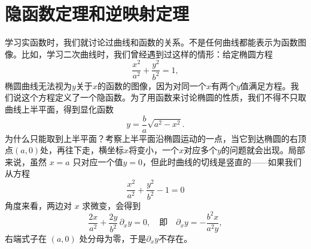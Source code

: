 \documentclass[12pt,UTF8,fontset=none]{ctexbook}
\begin{document}


\section{隐函数定理和逆映射定理}

学习实函数时，我们就讨论过曲线和函数的关系。不是任何曲线都能表示为函数图像。比如，学习二次曲线时，我们曾经遇到过这样的情形：给定椭圆方程
\[
\frac{x^2}{a^2}+\frac{y^2}{b^2}=1,
\]
椭圆曲线无法视为$y$关于$x$的函数的图像，因为对同一个$x$有两个$y$值满足方程。我们说这个方程定义了一个隐函数。为了用函数来讨论椭圆的性质，我们不得不只取曲线上半平面，得到显化函数
\[
y = \frac{b}{a}\sqrt{a^2-x^2}.
\]
为什么只能取到上半平面？考察上半平面沿椭圆运动的一点，当它到达椭圆的右顶点$(a,0)$处，再往下走，横坐标$x$将变小，一个$x$对应多个$y$的问题就会出现。局部来说，虽然 $x=a$ 只对应一个值$y=0$，但此时曲线的切线是竖直的——如果我们从方程
\[
\frac{x^2}{a^2}+\frac{y^2}{b^2}-1=0
\]
角度来看，两边对 $x$ 求微变，会得到
\[
\frac{2x}{a^2}+\frac{2y}{b^2}\,\partial_x y =0,\quad\mbox{即}\quad \partial_x y = -\frac{b^2 x}{a^2 y},
\]
右端式子在 $(a,0)$ 处分母为零，于是$\partial_x y$不存在。
\end{document}

